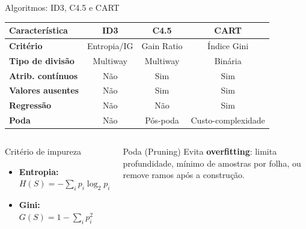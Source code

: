 \documentclass[aspectratio=169]{beamer}
\begin{document}
\begin{frame}{Algoritmos: ID3, C4.5 e CART}
\begin{center}
\begin{tabular}{>{\bfseries}p{3.2cm}ccc}
\toprule
Característica & \textcolor{mineblue}{ID3} & \textcolor{mineorange}{C4.5} & \textcolor{minegreen}{CART} \\
\midrule
Critério & Entropia/IG & Gain Ratio & Índice Gini \\
Tipo de divisão & Multiway & Multiway & Binária \\
Atrib. contínuos & Não & Sim & Sim \\
Valores ausentes & Não & Sim & Sim \\
Regressão & Não & Não & Sim \\
Poda & Não & Pós-poda & Custo-complexidade \\
\bottomrule
\end{tabular}
\end{center}
\vspace{0.3em}
\begin{columns}[T]
\begin{block}{Critério de impureza}
  \begin{itemize}
    \item \textbf{Entropia:} $H(S) = -\sum_i p_i \log_2 p_i$
    \item \textbf{Gini:} $G(S) = 1 - \sum_i p_i^2$
  \end{itemize}
\end{block}
\begin{alertblock}{Poda (Pruning)}
  Evita \textbf{overfitting}: limita profundidade, mínimo de amostras por folha, ou remove ramos após a construção.
\end{alertblock}
\end{columns}
\end{frame}
\end{document}
